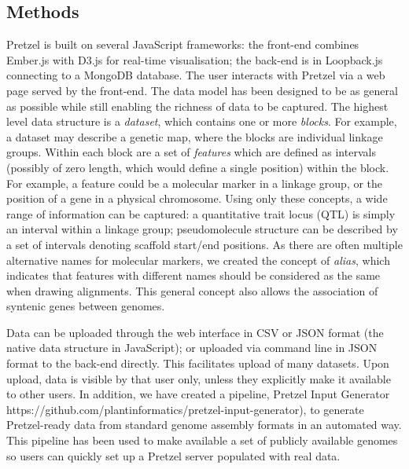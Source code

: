 \documentclass{bioinfo}
\begin{document}
%
\begin{methods}
\section{Methods}

Pretzel is built on several JavaScript frameworks: the front-end combines Ember.js with D3.js
  for real-time visualisation; the back-end is in Loopback.js connecting to a MongoDB database. 
%
The user interacts with Pretzel via a web page served by the front-end. 
%
The data model has been designed to be as general as possible while still enabling the richness of
  data to be captured. 
%
  The highest level data structure is a \textit{dataset}, which contains one or more \textit{blocks}.
%
For example, a dataset may describe a genetic map, where the blocks are individual linkage groups. 
%
  Within each block are a set of \textit{features} which are defined as intervals (possibly of zero length,
  which would define a single position) within the block. 
%
For example, a feature could be a molecular marker in a linkage group, or the position of a gene in
  a physical chromosome. 
%
Using only these concepts, a wide range of information can be captured: a quantitative trait locus
  (QTL) is simply an interval within a linkage group; pseudomolecule structure can be described by a
  set of intervals denoting scaffold start/end positions. 
%
As there are often multiple alternative names for molecular markers, we created the concept of
  \textit{alias}, which indicates that features with different names should be considered as the same when
  drawing alignments. 
%
This general concept also allows the association of syntenic genes between genomes.

Data can be uploaded through the web interface in CSV or JSON format (the native data structure in
  JavaScript); or uploaded via command line in JSON format to the back-end directly. 
%
This facilitates upload of many datasets. 
%
Upon upload, data is visible by that user only, unless they explicitly make it available to other
  users. 
%
In addition, we have created a pipeline, Pretzel Input Generator
  {{https://github.com/plantinformatics/pretzel-input-generator}}), to generate Pretzel-ready data
  from standard genome assembly formats in an automated way. This pipeline has been used to make
  available a set of publicly available genomes so users can quickly set up a Pretzel server
  populated with real data.


\end{methods}
\end{document}
